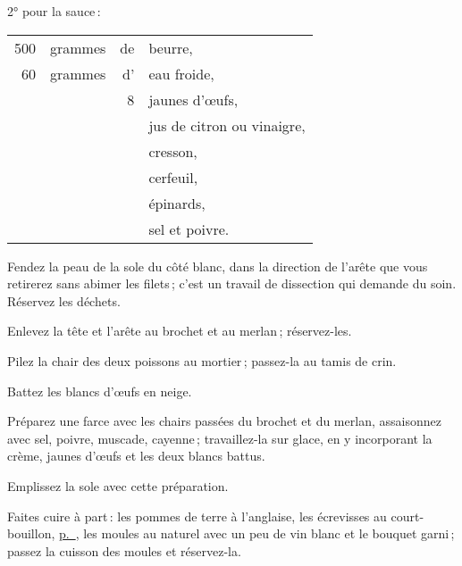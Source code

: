 \medskip

2° pour la sauce :

\medskip

\footnotesize
\begin{longtable}{rrrp{16em}}
    500 & grammes & de & beurre,                                                                          \\
     60 & grammes & d’ & eau froide,                                                                      \\
        &         &  8 & jaunes d'œufs,                                                                   \\
        &         &    & jus de citron ou vinaigre,                                                       \\
        &         &    & cresson,                                                                         \\
        &         &    & cerfeuil,                                                                        \\
        &         &    & épinards,                                                                        \\
        &         &    & sel et poivre.                                                                   \\
\end{longtable}
\normalsize

Fendez la peau de la sole du côté blanc, dans la direction de l'arête que vous
retirerez sans abimer les filets ; c'est un travail de dissection qui demande
du soin. Réservez les déchets.

Enlevez la tête et l'arête au brochet et au merlan ; réservez-les.

Pilez la chair des deux poissons au mortier ; passez-la au tamis de crin.

Battez les blancs d'œufs en neige.

Préparez une farce avec les chairs passées du brochet et du merlan, assaisonnez
avec sel, poivre, muscade, cayenne ; travaillez-la sur glace, en y incorporant
la crème, {\mmm} jaunes d'œufs et les deux blancs battus.

Emplissez la sole avec cette préparation.

Faites cuire à part : les pommes de terre à l'anglaise, les écrevisses au
court-bouillon, \hyperlink{p0287}{p. \pageref{pg0287}}, les moules au naturel avec
un peu de vin blanc et le bouquet garni ; passez la cuisson des moules et
réservez-la.

